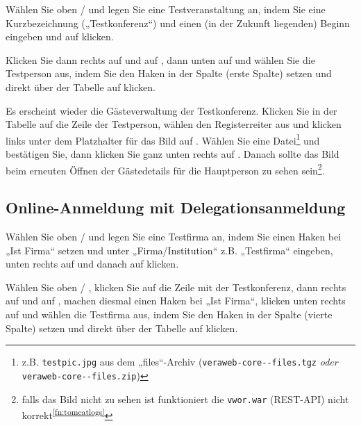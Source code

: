 Wählen Sie oben  /  und legen Sie eine Testveranstaltung an, indem Sie eine
Kurzbezeichnung („Testkonferenz“) und einen (in der Zukunft liegenden)
Beginn eingeben und auf  klicken.

Klicken Sie dann rechts auf  und auf
, dann unten auf 
und wählen Sie die Testperson aus, indem Sie den Haken in der Spalte
 (erste Spalte) setzen und direkt über der Tabelle auf
 klicken.

Es erscheint wieder die Gästeverwaltung der Testkonferenz. Klicken Sie
in der Tabelle auf die Zeile der Testperson, wählen den Registerreiter
 aus und klicken links unter dem Platzhalter
für das Bild auf . Wählen Sie eine
Datei\Hair\footnote{\label{fn:testpic}z.B. \texttt{testpic.jpg} aus dem
„files“-Archiv (\texttt{veraweb-core-\vwiaverssw{}-files.tgz} \emph{oder}
\texttt{veraweb-core-\vwiaverssw{}-files.zip})} und bestätigen Sie, dann
klicken Sie ganz unten rechts auf .
Danach sollte das Bild beim erneuten Öffnen der Gästedetails für
die Hauptperson zu sehen sein\Hair\footnote{falls das Bild nicht
zu sehen ist funktioniert die \texttt{vwor.war} (REST-API) nicht
korrekt\Hair\textsuperscript{\ref{fn:tomcatlogs}}}.

\ifoa
\subsection{Online-Anmeldung mit Delegationsanmeldung}

Wählen Sie oben  / 
und legen Sie eine Testfirma an, indem Sie einen Haken bei „Ist Firma“
setzen und unter „Firma/Institution“ z.B. „Testfirma“ eingeben, unten
rechts auf  und danach auf
 klicken.

Wählen Sie oben  /
, klicken Sie auf die Zeile mit
der Testkonferenz, dann rechts auf 
und auf , machen diesmal einen Haken bei
„Ist Firma“, klicken unten rechts auf  und wählen
die Testfirma aus, indem Sie den Haken in der Spalte 
(vierte Spalte) setzen und direkt über der Tabelle auf
 klicken.

